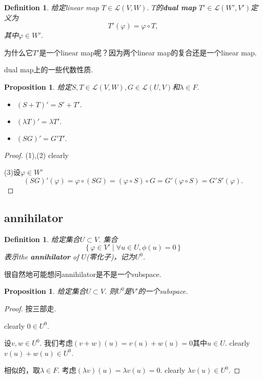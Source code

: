 \documentclass{article}
\newtheorem{proposition}[theorem]{Proposition}
\newtheorem{definition}[theorem]{Definition}
\newcommand\Set[2]{\{\,#1\mid#2\,\}} %
\begin{document}
\begin{definition}
\rm 给定linear map $T \in \mathcal{L}(V,W)$. $T$的\textbf{dual map} $T' \in \mathcal{L}(W',V')$定义为
$$
T'(\varphi) = \varphi \circ T,
$$
其中$\varphi \in W'$.
\end{definition}

{\color{blue} 为什么它$T'$是一个linear map呢？因为两个linear map的复合还是一个linear map}. 

{\color{red} dual map上的一些代数性质}.
\begin{proposition}
给定$S,T \in \mathcal{L}(V,W),G \in \mathcal{L}(U,V)$和$\lambda \in F$.
\begin{itemize}
	\item $(S+T)' = S' + T'.$
	\item $(\lambda T)' = \lambda T'.$
	\item $(SG)' = G'T'.$
\end{itemize}
\end{proposition}

\begin{proof}
(1),(2) clearly

(3)设$\varphi \in W'$
$$
(SG)'(\varphi) = \varphi \circ (SG) = (\varphi \circ S) \circ G = G'(\varphi \circ S) = G'S'(\varphi).
$$
\end{proof}

\newpage
\subsection{annihilator}

\begin{definition}
\rm 给定集合$U \subset V$. 集合
$$
\Set{\varphi \in V'}{\forall u \in U,\phi(u) =  0}
$$
表示the \textbf{annihilator} of $U$(零化子)，记为$U^0$.
\end{definition}

{\color{red} 很自然地可能想问annihilator是不是一个subspace}.
\begin{proposition}
\rm 给定集合$U \subset V$. 则$U^0$是$V'$的一个subspace.
\end{proposition}

\begin{proof}
按三部走.

clearly $0 \in U^0$.

设$v,w \in U^0$. 我们考虑$(v+w)(u) = v(u)+w(u) = 0$其中$u \in U$. clearly $v(u)+w(u) \in U^0$.

相似的，取$\lambda \in F$. 考虑$(\lambda v)(u)=\lambda v(u) = 0$. clearly $\lambda v(u) \in U^0.$
\end{proof}
\end{document}
